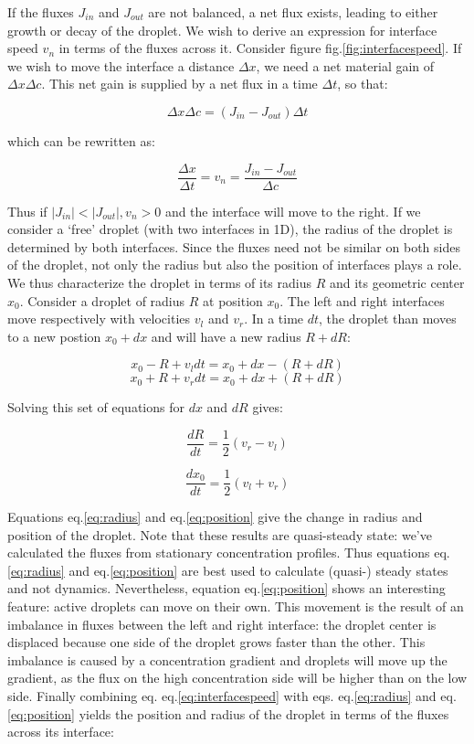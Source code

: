 \documentclass[12pt,a4paper,]{Dissertate}
\begin{document}
If the fluxes \(J_{in}\) and \(J_{out}\) are not balanced, a net flux
exists, leading to either growth or decay of the droplet. We wish to
derive an expression for interface speed \(v_n\) in terms of the fluxes
across it. Consider figure fig.\ref{fig:interfacespeed}. If we wish to
move the interface a distance \(\Delta x\), we need a net material gain
of \(\Delta x \Delta c\). This net gain is supplied by a net flux in a
time \(\Delta t\), so that:

\[
\Delta x \Delta c = (J_{in}-J_{out})\Delta t
\]

which can be rewritten as:

\begin{equation}
\frac{\Delta x}{\Delta t} = v_n = \frac{J_{in}-J_{out}}{\Delta c}
\label{eq:interfacespeed}\end{equation}

Thus if \(|J_{in}|<|J_{out}|, v_n>0\) and the interface will move to the
right. If we consider a `free' droplet (with two interfaces in 1D), the
radius of the droplet is determined by both interfaces. Since the fluxes
need not be similar on both sides of the droplet, not only the radius
but also the position of interfaces plays a role. We thus characterize
the droplet in terms of its radius \(R\) and its geometric center
\(x_0\). Consider a droplet of radius \(R\) at position \(x_0\). The
left and right interfaces move respectively with velocities \(v_l\) and
\(v_r\). In a time \(dt\), the droplet than moves to a new postion
\(x_0+dx\) and will have a new radius \(R+dR\):

\[
x_0-R+v_ldt=x_0+dx-(R+dR)
\] \[
x_0+R+v_rdt=x_0+dx+(R+dR)
\]

Solving this set of equations for \(dx\) and \(dR\) gives:

\begin{equation}
\frac{dR}{dt}=\frac{1}{2}(v_r-v_l)
\label{eq:radius}\end{equation}

\begin{equation}
\frac{dx_0}{dt}=\frac{1}{2}(v_l+v_r)
\label{eq:position}\end{equation}

Equations eq.\ref{eq:radius} and eq.\ref{eq:position} give the change
in radius and position of the droplet. Note that these results are
quasi-steady state: we've calculated the fluxes from stationary
concentration profiles. Thus equations eq.\ref{eq:radius} and
eq.\ref{eq:position} are best used to calculate (quasi-) steady states
and not dynamics. Nevertheless, equation eq.\ref{eq:position} shows an
interesting feature: active droplets can move on their own. This
movement is the result of an imbalance in fluxes between the left and
right interface: the droplet center is displaced because one side of the
droplet grows faster than the other. This imbalance is caused by a
concentration gradient and droplets will move up the gradient, as the
flux on the high concentration side will be higher than on the low side.
Finally combining eq. eq.\ref{eq:interfacespeed} with eqs.
eq.\ref{eq:radius} and eq.\ref{eq:position} yields the position and
radius of the droplet in terms of the fluxes across its interface:
\end{document}
